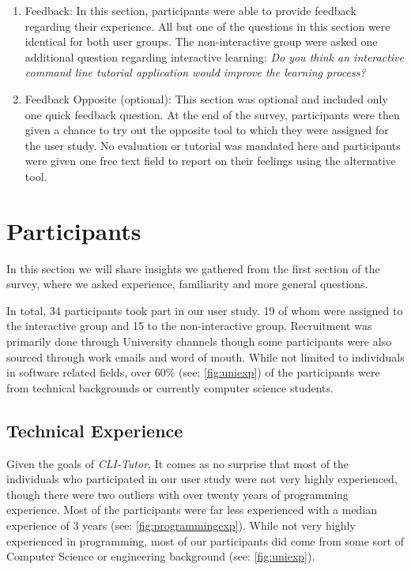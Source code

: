 \begin{enumerate}
	\item Feedback: In this section, participants were able to provide feedback
	      regarding their experience. All but one of the questions in this
	      section were identical for both user groups. The non-interactive group
	      were asked one additional question regarding interactive learning:
	      \textit{Do you think an interactive command line tutorial application
		      would improve the learning process?}

	\item Feedback Opposite (optional): This section was optional and included
	      only one quick feedback question. At the end of the survey,
	      participants were then given a chance to try out the opposite tool to
          which they were assigned for the  user study. No evaluation or
          tutorial was mandated here and participants were given one free text
          field to report on their feelings using the alternative tool.
\end{enumerate}


\section{Participants}

In this section we will share insights we gathered from the first section of
the survey, where we asked experience, familiarity and more general questions.

In total, 34 participants took part in our user study. 19 of whom were assigned
to the interactive group and 15 to the non-interactive group. Recruitment was
primarily done through University channels though some participants were also
sourced through work emails and word of mouth. While not limited to individuals
in software related fields, over 60\% (see: \autoref{fig:uniexp}) of the
participants were from technical backgrounds or currently computer science
students.

\subsection{Technical Experience}

Given the goals of \textit{CLI-Tutor}, It comes as no surprise that most of the
individuals who participated in our user study were not very highly
experienced, though there were two outliers with over twenty years of
programming experience. Most of the participants were far less experienced with
a median experience of 3 years (see: \autoref{fig:programmingexp}). While not
very highly experienced in programming, most of our participants did come from
some sort of Computer Science or engineering background (see:
\autoref{fig:uniexp}).

